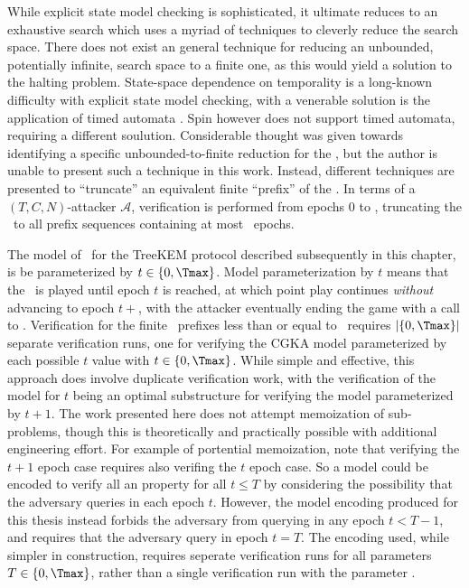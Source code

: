 While explicit state model checking is sophisticated, it ultimate reduces to an exhaustive search which uses a myriad of techniques to cleverly reduce the search space.
There does not exist an general technique for reducing an unbounded, potentially infinite, search space to a finite one, as this would yield a solution to the halting problem.
State-space dependence on temporality is a long-known difficulty with explicit state model checking, with a venerable solution is the application of timed automata \autocite{alur1994theory}.
Spin however does not support timed automata, requiring a different soulution.
Considerable thought was given towards identifying a specific unbounded-to-finite reduction for the \CGKAsec, but the author is unable to present such a technique in this work.
Instead, different techniques are presented to ``truncate'' an equivalent finite ``prefix'' of the \CGKAsec.
In terms of a \((T, C, N)\)-attacker \(\mathcal{A}\), verification is performed from epochs $0$ to \Tmax, truncating the \CGKAsec\ to all prefix sequences containing at most \Tmax\ epochs.

The model of \CGKAsec\ for the TreeKEM protocol described subsequently in this chapter, is be parameterized by $t \in \{ 0, \Tmax \}$.
Model parameterization by $t$ means that the \CGKAsec\ is played until epoch $t$ is reached, at which point play continues \emph{without} advancing to epoch $t+$, with the attacker eventually ending the game with a call to .
Verification for the finite \CGKAsec\ prefixes less than or equal to \Tmax\ requires $|\{ 0, \Tmax \}|$ separate verification runs, one for verifying the CGKA model parameterized by each possible $t$ value with $t \in \{ 0, \Tmax \}$.
While simple and effective, this approach does involve duplicate verification work, with the verification of the model for $t$ being an optimal substructure for verifying the model parameterized by $t+1$.
The work presented here does not attempt memoization of sub-problems, though this is theoretically and practically possible with additional engineering effort.
For example of portential memoization, note that verifying the \(t+1\) epoch case requires also verifing the \(t\) epoch case.
So a model  could be encoded to verify all an  property for all \(t \le T\) by considering the possibility that the adversary queries  in each epoch \(t\).
However, the model encoding produced for this thesis instead forbids the adversary from querying  in any epoch \(t < T - 1 \), and requires that the adversary query  in epoch \(t = T\).
The encoding used, while simpler in construction, requires seperate verification runs for all parameters \(T \in \{ 0, \Tmax \}\), rather than a single verification run with the parameter \Tmax.


